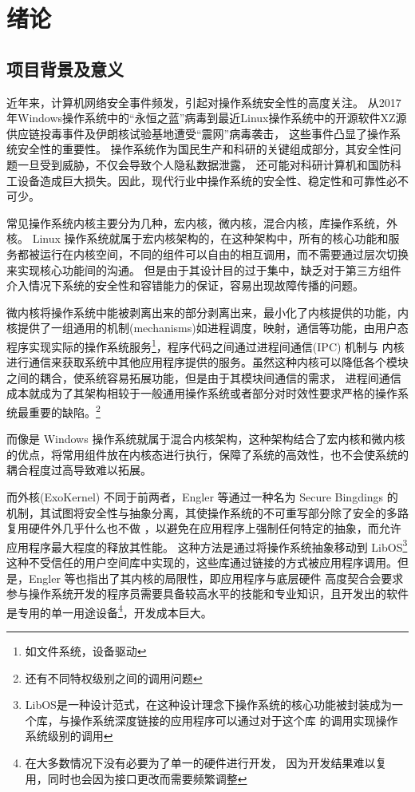 \section{绪论}

\subsection{项目背景及意义}

    近年来，计算机网络安全事件频发，引起对操作系统安全性的高度关注。
    从2017年Windows操作系统中的“永恒之蓝”病毒到最近Linux操作系统中的开源软件XZ源供应链投毒事件及伊朗核试验基地遭受“震网”病毒袭击，
    这些事件凸显了操作系统安全性的重要性。
    操作系统作为国民生产和科研的关键组成部分，其安全性问题一旦受到威胁，不仅会导致个人隐私数据泄露，
    还可能对科研计算机和国防科工设备造成巨大损失。因此，现代行业中操作系统的安全性、稳定性和可靠性必不可少。

    常见操作系统内核主要分为几种，宏内核，微内核，混合内核，库操作系统，外核。
    Linux 操作系统就属于宏内核架构的，在这种架构中，所有的核心功能和服务都被运行在内核空间，不同的组件可以自由的相互调用，而不需要通过层次切换来实现核心功能间的沟通。
    但是由于其设计目的过于集中，缺乏对于第三方组件介入情况下系统的安全性和容错能力的保证，容易出现故障传播的问题。
    \cite{singh_microkernel_nodate}

    微内核将操作系统中能被剥离出来的部分剥离出来，最小化了内核提供的功能，内核提供了一组通用的机制(mechanisms)如进程调度，映射，通信等功能，由用户态程序实现实际的操作系统服务\footnote{如文件系统，设备驱动}，程序代码之间通过进程间通信(IPC) 机制与
    内核进行通信来获取系统中其他应用程序提供的服务。虽然这种内核可以降低各个模块之间的耦合，使系统容易拓展功能，但是由于其模块间通信的需求，
    进程间通信成本就成为了其架构相较于一般通用操作系统或者部分对时效性要求严格的操作系统最重要的缺陷。\footnote{还有不同特权级别之间的调用问题}
    \cite{hansen_nucleus_1970}

    而像是 Windows 操作系统就属于混合内核架构，这种架构结合了宏内核和微内核的优点，将常用组件放在内核态进行执行，保障了系统的高效性，也不会使系统的耦合程度过高导致难以拓展。

    而外核(ExoKernel) 不同于前两者，Engler 等通过一种名为 Secure Bingdings 的机制，其试图将安全性与抽象分离，其使操作系统的不可重写部分除了安全的多路复用硬件外几乎什么也不做
    ，以避免在应用程序上强制任何特定的抽象，而允许应用程序最大程度的释放其性能。
    这种方法是通过将操作系统抽象移动到 LibOS\footnote{LibOS是一种设计范式，在这种设计理念下操作系统的核心功能被封装成为一个库，与操作系统深度链接的应用程序可以通过对于这个库
    的调用实现操作系统级别的调用}
     这种不受信任的用户空间库中实现的，这些库通过链接的方式被应用程序调用。但是，Engler 等也指出了其内核的局限性，即应用程序与底层硬件
    高度契合会要求参与操作系统开发的程序员需要具备较高水平的技能和专业知识，且开发出的软件是专用的单一用途设备\footnote{在大多数情况下没有必要为了单一的硬件进行开发，
    因为开发结果难以复用，同时也会因为接口更改而需要频繁调整}，开发成本巨大。
    \cite{wikiosdev_exokernel, engler_exokernel_1998}

